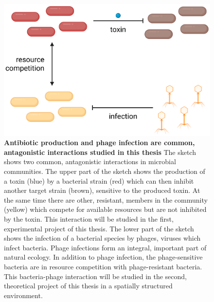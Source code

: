 \begin{figure}
\includegraphics[width=\linewidth]{graphics/2025_09_30_intro_fig1.png}
\caption{\textbf{Antibiotic production and phage infection are common, antagonistic interactions studied in this thesis} The sketch shows two common, antagonistic interactions in microbial communities. The upper part of the sketch shows the production of a toxin (blue) by a bacterial strain (red) which can then inhibit another target strain (brown), sensitive to the produced toxin. At the same time there are other, resistant, members in the community (yellow) which compete for available resources but are not inhibited by the toxin. This interaction will be studied in the first, experimental project of this thesis. The lower part of the sketch shows the infection of a bacterial species by \gls{phage}s, viruses which infect bacteria. Phage infections form an integral, important part of natural ecology. In addition to phage infection, the phage-sensitive bacteria are in resource competition with phage-resistant bacteria. This bacteria-phage interaction will be studied in the second, theoretical project of this thesis in a spatially structured environment.}
\label{fig:intro_shared_interactions}
\end{figure}